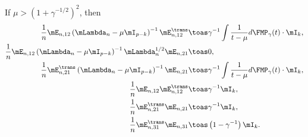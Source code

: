 \begin{lemma}\label{L:eij-product-limits}
    If $\mu > \left(1 + \gamma^{-1/2} \right)^2$, then
    \begin{align*}
        \frac{1}{n}
        \mE_{n,12}
        \left(
            \mLambda_n
            -
            \mu \mI_{p-k}
        \right)^{-1}
        \mE_{n,12}^\trans
            &\toas
                \gamma^{-1}
                \int
                    \frac{1}{t - \mu} d\FMP_\gamma(t)
                \cdot
                \mI_k, \\
        \frac{1}{n}
        \mE_{n,12}
        \left(
            \mLambda_n
            -
            \mu \mI_{p-k}
        \right)^{-1}
        \mLambda_n^{1/2}
        \mE_{n,21}
            &\toas
                0, \\
        \frac{1}{n}
        \mE_{n,21}^\trans
        \left(
            \mLambda_n
            -
            \mu \mI_{p-k}
        \right)^{-1}
        \mE_{n,21}
            &\toas
                \gamma^{-1}
                \int
                    \frac{1}{t - \mu} d\FMP_\gamma(t)
                \cdot
                \mI_k, \\
        \frac{1}{n}
        \mE_{n,12} \mE_{n,12}^\trans
            &\toas
            \gamma^{-1}
            \mI_k, \\
        \frac{1}{n}
        \mE_{n,21}^\trans \mE_{n,21}
            &\toas
                \gamma^{-1}
                \mI_k, \\
        \frac{1}{n}
        \mE_{n,31}^\trans \mE_{n,31}
            &\toas
                \left( 1 - \gamma^{-1} \right)
                \mI_k.
    \end{align*}
\end{lemma}
